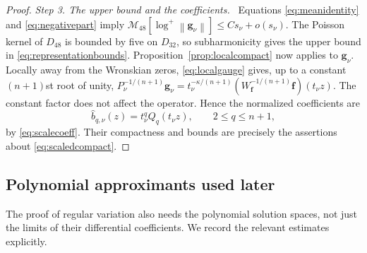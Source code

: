 \documentclass[11pt,letterpaper,reqno]{amsart}
\theoremstyle{remark}
\numberwithin{equation}{section}
\newcommand{\mean}[2]{\mathcal M_{#1}\!\left[#2\right]}
\newcommand{\norm}[1]{\left\lVert#1\right\rVert}
\newcommand{\fv}{\bm f}
\newcommand{\gv}{\bm g}
\newcommand{\step}[1]{\medskip\noindent\emph{#1}\ }
\begin{document}
\begin{proof}
\step{Step 3. The upper bound and the coefficients.}
Equations \eqref{eq:meanidentity} and \eqref{eq:negativepart} imply
$\mean{48}{\log^+\norm{\gv_\nu}}\le Cs_\nu+o(s_\nu)$.
The Poisson kernel of $D_{48}$ is bounded by five on $D_{32}$, so
subharmonicity gives the upper bound in \eqref{eq:representationbounds}.
Proposition~\ref{prop:localcompact} now applies to $\gv_\nu$.
Locally away from the Wronskian zeros, \eqref{eq:localgauge} gives, up to a
constant $(n+1)$st root of unity,
$P_\nu^{-1/(n+1)}\gv_\nu=t_\nu^{-\kappa/(n+1)}
(W_{\fv}^{-1/(n+1)}\fv)(t_\nu z)$.
The constant factor does not affect the operator. Hence the normalized
coefficients are
\begin{equation}\label{eq:canonical-coefficient-identification}
 \widehat b_{q,\nu}(z)=t_\nu^qQ_q(t_\nu z),\qquad 2\le q\le n+1,
\end{equation}
by \eqref{eq:scalecoeff}. Their compactness and bounds are precisely the
assertions about \eqref{eq:scaledcompact}.
\end{proof}

\subsection{Polynomial approximants used later}

The proof of regular variation also needs the polynomial solution spaces,
not just the limits of their differential coefficients. We record the
relevant estimates explicitly.
\end{document}
